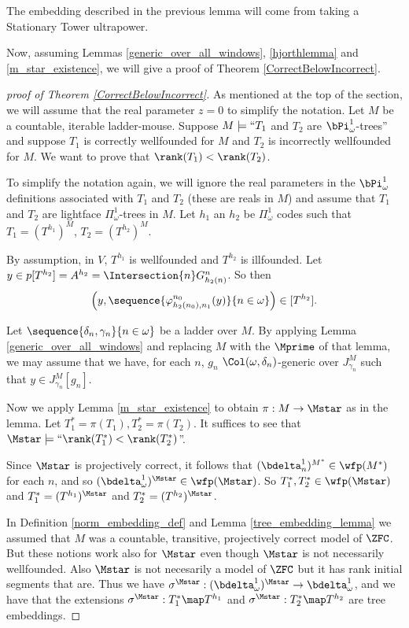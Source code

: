\documentclass[oneside,12pt]{amsart}
\begin{document}
The embedding described in the previous lemma will come from taking a Stationary Tower
ultrapower.

Now, assuming Lemmas \ref{generic_over_all_windows}, \ref{hjorthlemma} and
\ref{m_star_existence}, we will give a proof of Theorem \ref{CorrectBelowIncorrect}.

\begin{proof}[proof of Theorem \ref{CorrectBelowIncorrect}]
As mentioned at the top of the section, we will assume that the real parameter
$z=0$ to simplify the notation.
Let $M$ be a countable, iterable ladder-mouse.
Suppose $M\models ``T_1$ and $T_2$ are $\bPi^1_{\omega}$-trees'' and
suppose $T_1$ is correctly wellfounded for $M$ and
$T_2$ is incorrectly wellfounded for $M$. We want to prove that
$\rank(T_1) < \rank(T_2)$.

To simplify the notation again, we will ignore the real parameters
in the
$\bPi^1_{\omega}$ definitions associated with $T_1$ and $T_2$
(these are reals in $M$)
and assume that
$T_1$ and $T_2$ are lightface $\Pi^1_{\omega}$-trees in $M$.
Let $h_1$ an $h_2$ be $\Pi^1_{\omega}$
codes such that $T_1=(T^{h_1})^M$, $T_2=(T^{h_2})^M$.

By assumption, in $V$, $T^{h_1}$ is wellfounded and $T^{h_2}$ is illfounded. Let
$y\in p[T^{h_2}] = A^{h_2} = \Intersection{n} G^n_{h_2(n)}$.
So then
$$\left(y,\sequence{\varphi^{n_0}_{h_2(n_0),n_1}(y)}{n\in\omega} \right)\in[T^{h_2}].$$

Let $\sequence{\delta_n,\gamma_n}{n\in\omega}$ be a ladder over $M$.
By applying Lemma \ref{generic_over_all_windows} and replacing $M$ with the $\Mprime$ of
that lemma, we may assume that we have, for each $n$, $g_n$
$\Col(\omega,\delta_n)$-generic over $J^M_{\gamma_n}$ such that $y\in J^M_{\gamma_n}[g_n]$.

Now we apply Lemma \ref{m_star_existence} to obtain $\pi:M\to\Mstar$ as in
the lemma.
Let $T_1^* = \pi(T_1), T_2^* = \pi(T_2)$.
It suffices to see that $\Mstar\models\text{``}\rank(T_1^*) < \rank(T_2^*)$''.

Since $\Mstar$ is projectively correct, it follows that $(\bdelta^1_n)^{M^*}\in\wfp(M^*)$
for each $n$, and so $(\bdelta^1_{\omega})^{\Mstar}\in\wfp(\Mstar)$. So
$T_1^*,T_2^*\in\wfp(\Mstar)$ and $T_1^* = (T^{h_1})^{\Mstar}$
and $T_2^* = (T^{h_2})^{\Mstar}$.

In Definition \ref{norm_embedding_def} and
Lemma \ref{tree_embedding_lemma} we assumed that $M$ was a countable, transitive, projectively correct model of $\ZFC$. But these notions work also for $\Mstar$ even though $\Mstar$ is not
necessarily wellfounded. Also $\Mstar$ is not necesarily a model of $\ZFC$ but it has
rank initial segments that are. Thus we have
$\sigma^{\Mstar}:(\bdelta^1_{\omega})^{\Mstar}\to\bdelta^1_{\omega}$, and
we have that the extensions
$\sigma^{\Mstar}:T_1^*\map T^{h_1}$ and $\sigma^{\Mstar}:T_2^*\map T^{h_2}$ are tree
embeddings.


\end{proof}
\end{document}
